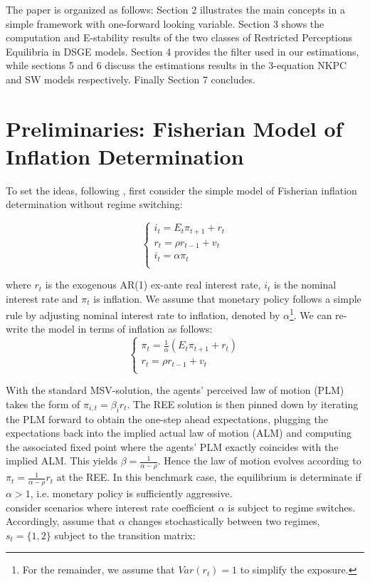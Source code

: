 \documentclass[12pt,reqno]{article}
\numberwithin{equation}{section}
\begin{document}
The paper is organized as follows: Section 2 illustrates the main concepts in a simple framework with one-forward looking variable. Section 3 shows the  computation and E-stability results of the two classes of Restricted Perceptions Equilibria in DSGE models. Section 4 provides the filter used in our estimations, while sections 5 and 6 discuss the estimations results in the 3-equation NKPC and SW models respectively. Finally Section 7 concludes.   


\section{Preliminaries: Fisherian Model of Inflation Determination}



To set the ideas, following \cite{davig2007generalizing}, first consider the simple model of Fisherian inflation determination without regime switching: 


$$
\begin{cases}
i_t = E_t \pi_{t+1} + r_t \\
r_t = \rho r_{t-1} + v_t \\
i_t = \alpha\pi_t \\
\end{cases}
$$

where $ r_t $ is the exogenous AR(1) ex-ante real interest rate, $ i_t $ is the nominal interest rate and $\pi_t $ is inflation. We assume that monetary policy follows a simple rule by adjusting nominal interest rate to inflation, denoted by $\alpha$\footnote{For the remainder, we assume that $Var(r_t)=1$ to simplify the exposure.}. We can re-write the model in terms of inflation as follows: \\

$$
\begin{cases}
\pi_t = \frac{1}{\alpha}(E_t \pi_{t+1} + r_t) \\
r_t = \rho r_{t-1} + v_t \\
\end{cases}
$$

With the standard MSV-solution, the agents’ perceived law of motion (PLM) takes the form of $ \pi_{i,t} = \beta_i r_t $. The REE solution is then pinned down by iterating the PLM forward to obtain the one-step ahead expectations, plugging the expectations back into the implied actual law of motion (ALM) and computing the associated fixed point where the agents’ PLM exactly coincides with the implied ALM. This yields $\beta= \frac{1}{\alpha-\rho}$. Hence the law of motion evolves according to $\pi_t= \frac{1}{\alpha-\rho} r_t $ at the REE. In this benchmark case, the equilibrium is determinate if $\alpha>1 $, i.e. monetary policy is sufficiently aggressive.\\
\cite{davig2007generalizing} consider scenarios where interest rate coefficient $\alpha$ is subject to regime switches. Accordingly, assume that $\alpha$ changes stochastically between two regimes, $s_t = \{1,2 \} $ subject to the transition matrix:
\end{document}
